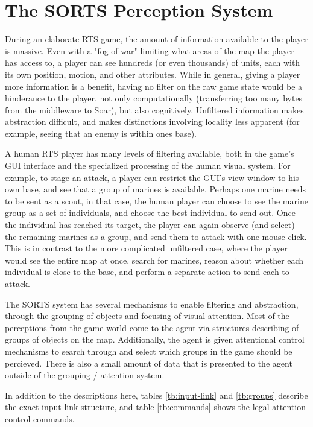\section{The SORTS Perception System}
\label{section:perception}

During an elaborate RTS game, the amount of information available to the player is massive. Even with a "fog of war" limiting what areas of the map the player has access to, a player can see hundreds (or even thousands) of units, each with its own position, motion, and other attributes. While in general, giving a player more information is a benefit, having no filter on the raw game state would be a hinderance to the player, not only computationally (transferring too many bytes from the middleware to Soar), but also cognitively. Unfiltered information makes abstraction difficult, and makes distinctions involving locality less apparent (for example, seeing that an enemy is within ones base).

A human RTS player has many levels of filtering available, both in the game's GUI interface and the specialized processing of the human visual system. For example, to stage an attack, a player can restrict the GUI's view window to his own base, and see that a group of marines is available. Perhaps one marine needs to be sent as a scout, in that case, the human player can choose to see the marine group as a set of individuals, and choose the best individual to send out. Once the individual has reached its target, the player can again observe (and select) the remaining marines as a group, and send them to attack with one mouse click. This is in contrast to the more complicated unfiltered case, where the player would see the entire map at once, search for marines, reason about whether each individual is close to the base, and perform a separate action to send each to attack.

The SORTS system has several mechanisms to enable filtering and abstraction, through the grouping of objects and focusing of visual attention. Most of the perceptions from the game world come to the agent via structures describing of groups of objects on the map. Additionally, the agent is given attentional control mechanisms to search through and select which groups in the game should be percieved. There is also a small amount of data that is presented to the agent outside of the grouping / attention system.

In addition to the descriptions here, tables \ref{tb:input-link} and \ref{tb:groups} describe the exact input-link structure, and table \ref{tb:commands} shows the legal attention-control commands.

